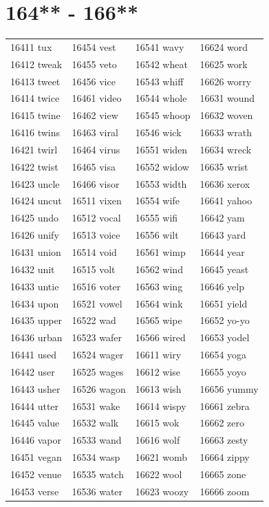 \documentclass[10pt, oneside]{book}
\begin{document}
\begin{table}
	\centering
	\section*{164** - 166**}
	\begin{tabular}{l l l l}
16411 tux &16454 vest &16541 wavy &16624 word\\
16412 tweak &16455 veto &16542 wheat &16625 work\\
16413 tweet &16456 vice &16543 whiff &16626 worry\\
16414 twice &16461 video &16544 whole &16631 wound\\
16415 twine &16462 view &16545 whoop &16632 woven\\
16416 twins &16463 viral &16546 wick &16633 wrath\\
16421 twirl &16464 virus &16551 widen &16634 wreck\\
16422 twist &16465 visa &16552 widow &16635 wrist\\
16423 uncle &16466 visor &16553 width &16636 xerox\\
16424 uncut &16511 vixen &16554 wife &16641 yahoo\\
16425 undo &16512 vocal &16555 wifi &16642 yam\\
16426 unify &16513 voice &16556 wilt &16643 yard\\
16431 union &16514 void &16561 wimp &16644 year\\
16432 unit &16515 volt &16562 wind &16645 yeast\\
16433 untie &16516 voter &16563 wing &16646 yelp\\
16434 upon &16521 vowel &16564 wink &16651 yield\\
16435 upper &16522 wad &16565 wipe &16652 yo-yo\\
16436 urban &16523 wafer &16566 wired &16653 yodel\\
16441 used &16524 wager &16611 wiry &16654 yoga\\
16442 user &16525 wages &16612 wise &16655 yoyo\\
16443 usher &16526 wagon &16613 wish &16656 yummy\\
16444 utter &16531 wake &16614 wispy &16661 zebra\\
16445 value &16532 walk &16615 wok &16662 zero\\
16446 vapor &16533 wand &16616 wolf &16663 zesty\\
16451 vegan &16534 wasp &16621 womb &16664 zippy\\
16452 venue &16535 watch &16622 wool &16665 zone\\
16453 verse &16536 water &16623 woozy &16666 zoom\\
	\end{tabular}
 \end{table}
\clearpage
\end{document}
